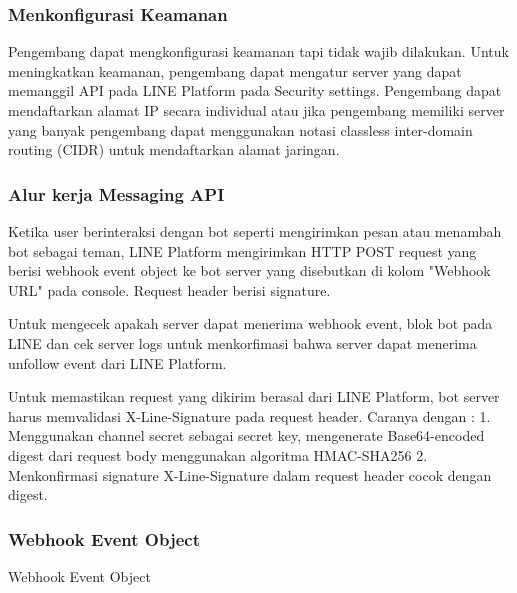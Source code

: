 
\subsubsection{Menkonfigurasi Keamanan}
Pengembang dapat mengkonfigurasi keamanan tapi tidak wajib dilakukan. Untuk meningkatkan keamanan, pengembang dapat mengatur server yang dapat memanggil API pada LINE Platform pada Security settings. Pengembang dapat mendaftarkan alamat IP secara individual atau jika pengembang memiliki server yang banyak pengembang dapat menggunakan notasi classless inter-domain routing (CIDR) untuk mendaftarkan alamat jaringan.

\subsubsection{Alur kerja Messaging API}
Ketika user berinteraksi dengan bot seperti mengirimkan pesan atau menambah bot sebagai teman, LINE Platform mengirimkan HTTP POST request yang berisi webhook event object ke bot server yang disebutkan di kolom "Webhook URL" pada console. Request header berisi signature. 

Untuk mengecek apakah server dapat menerima webhook event, blok bot pada LINE dan cek server logs untuk menkorfimasi bahwa server dapat menerima unfollow event dari LINE Platform.


Untuk memastikan request yang dikirim berasal dari LINE Platform, bot server harus memvalidasi X-Line-Signature pada request header. Caranya dengan :
1. Menggunakan channel secret sebagai secret key, mengenerate Base64-encoded digest dari request body menggunakan algoritma HMAC-SHA256
2. Menkonfirmasi signature X-Line-Signature dalam request header cocok dengan digest.
 

\subsubsection{Webhook Event Object}
Webhook Event Object


